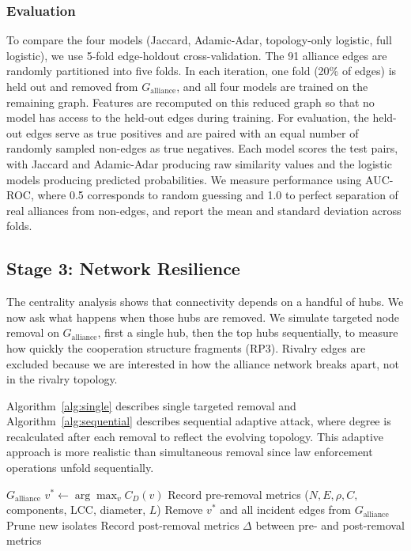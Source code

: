 \documentclass[11pt, a4paper]{article}
\begin{document}
\subsubsection{Evaluation}\label{sec:eval_methods}

To compare the four models (Jaccard, Adamic-Adar, topology-only logistic, full logistic), we use 5-fold edge-holdout cross-validation. The 91 alliance edges are randomly partitioned into five folds. In each iteration, one fold (20\% of edges) is held out and removed from $G_{\text{alliance}}$, and all four models are trained on the remaining graph. Features are recomputed on this reduced graph so that no model has access to the held-out edges during training. For evaluation, the held-out edges serve as true positives and are paired with an equal number of randomly sampled non-edges as true negatives. Each model scores the test pairs, with Jaccard and Adamic-Adar producing raw similarity values and the logistic models producing predicted probabilities. We measure performance using AUC-ROC, where 0.5 corresponds to random guessing and 1.0 to perfect separation of real alliances from non-edges, and report the mean and standard deviation across folds.

\subsection{Stage 3: Network Resilience}\label{sec:stage3_methods}

The centrality analysis shows that connectivity depends on a handful of hubs. We now ask what happens when those hubs are removed. We simulate targeted node removal on $G_{\text{alliance}}$, first a single hub, then the top hubs sequentially, to measure how quickly the cooperation structure fragments (RP3). Rivalry edges are excluded because we are interested in how the alliance network breaks apart, not in the rivalry topology.

Algorithm~\ref{alg:single} describes single targeted removal and Algorithm~\ref{alg:sequential} describes sequential adaptive attack, where degree is recalculated after each removal to reflect the evolving topology. This adaptive approach is more realistic than simultaneous removal since law enforcement operations unfold sequentially.

\begin{algorithm}[H]
\caption{Single targeted removal}\label{alg:single}
\begin{algorithmic}[1]
\Require $G_{\text{alliance}}$
\State $v^* \gets \arg\max_{v} C_D(v)$ 
\State Record pre-removal metrics ($N, E, \rho, C, $ components, LCC, diameter, $L$)
\State Remove $v^*$ and all incident edges from $G_{\text{alliance}}$
\State Prune new isolates
\State Record post-removal metrics
\State \Return $\Delta$ between pre- and post-removal metrics
\end{algorithmic}
\end{algorithm}
\end{document}
